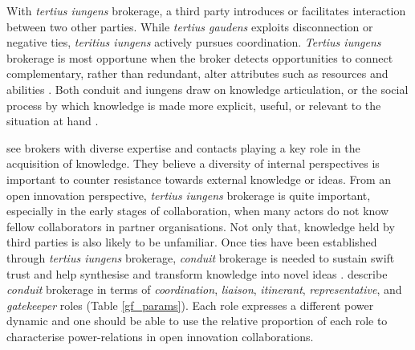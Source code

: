 With \emph{tertius iungens} brokerage, a third party introduces or facilitates interaction between two other parties. While \emph{tertius gaudens} exploits disconnection or negative ties, \emph{teritius iungens} actively pursues coordination. \emph{Tertius iungens} brokerage is most opportune when the broker detects opportunities to connect complementary, rather than redundant, alter attributes such as resources and abilities \citep{obstfeld2014brokerage}. Both conduit and iungens draw on knowledge articulation, or the social process by which knowledge is made more explicit, useful, or relevant to the situation at hand \citep{obstfeld2005social,obstfeld2011saying,obstfeld2012creative}.

\citet{cohen1990absorptive} see brokers with diverse expertise and contacts playing a key role in the acquisition of knowledge. They believe a diversity of internal perspectives is important to counter resistance towards external knowledge or ideas. From an open innovation perspective, \emph{tertius iungens} brokerage is quite important, especially in the early stages of collaboration, when many actors do not know fellow collaborators in partner organisations. Not only that, knowledge held by third parties is also likely to be unfamiliar. Once ties have been established through \emph{tertius iungens} brokerage, \emph{conduit} brokerage is needed to sustain swift trust and help synthesise and transform knowledge into novel ideas \citep{fleming2007collaborative,lingo2010nexus,quintane2016brokers}. \citet{gould1989structures} describe \emph{conduit} brokerage in terms of \emph{coordination}, \emph{liaison}, \emph{itinerant}, \emph{representative}, and \emph{gatekeeper} roles (Table \ref{gf_params}). Each role expresses a different power dynamic and one should be able to use the relative proportion of each role to characterise power-relations in open innovation collaborations. \medskip


